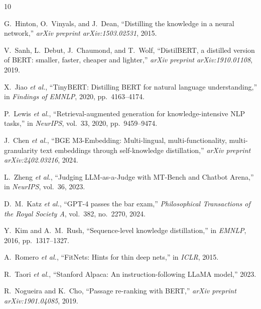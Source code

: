 \documentclass[conference]{IEEEtran}
\begin{document}
\begin{thebibliography}{10}

G.~Hinton, O.~Vinyals, and J.~Dean, ``Distilling the knowledge in a neural network,'' \textit{arXiv preprint arXiv:1503.02531}, 2015.

V.~Sanh, L.~Debut, J.~Chaumond, and T.~Wolf, ``DistilBERT, a distilled version of BERT: smaller, faster, cheaper and lighter,'' \textit{arXiv preprint arXiv:1910.01108}, 2019.

X.~Jiao \textit{et al.}, ``TinyBERT: Distilling BERT for natural language understanding,'' in \textit{Findings of EMNLP}, 2020, pp.~4163--4174.

P.~Lewis \textit{et al.}, ``Retrieval-augmented generation for knowledge-intensive NLP tasks,'' in \textit{NeurIPS}, vol.~33, 2020, pp.~9459--9474.

J.~Chen \textit{et al.}, ``BGE M3-Embedding: Multi-lingual, multi-functionality, multi-granularity text embeddings through self-knowledge distillation,'' \textit{arXiv preprint arXiv:2402.03216}, 2024.

L.~Zheng \textit{et al.}, ``Judging LLM-as-a-Judge with MT-Bench and Chatbot Arena,'' in \textit{NeurIPS}, vol.~36, 2023.

D.~M.~Katz \textit{et al.}, ``GPT-4 passes the bar exam,'' \textit{Philosophical Transactions of the Royal Society A}, vol.~382, no.~2270, 2024.

Y.~Kim and A.~M.~Rush, ``Sequence-level knowledge distillation,'' in \textit{EMNLP}, 2016, pp.~1317--1327.

A.~Romero \textit{et al.}, ``FitNets: Hints for thin deep nets,'' in \textit{ICLR}, 2015.

R.~Taori \textit{et al.}, ``Stanford Alpaca: An instruction-following LLaMA model,'' 2023.

R.~Nogueira and K.~Cho, ``Passage re-ranking with BERT,'' \textit{arXiv preprint arXiv:1901.04085}, 2019.

\end{thebibliography}
\end{document}
